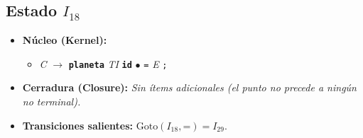 \documentclass[12pt, letterpaper]{article}
\begin{document}
\subsection*{Estado $I_{18}$ }
\begin{itemize}\setlength{\itemsep}{1pt}\setlength{\parskip}{0pt}
\item \textbf{Núcleo (Kernel):}
\begin{itemize}\setlength{\itemsep}{1pt}\setlength{\parskip}{0pt}
    \item \textit{C} $\to$ \textbf{\texttt{planeta}} \textit{TI} \textbf{\texttt{id}} $\bullet$ \texttt{=} \textit{E} \texttt{;}
\end{itemize}
\item \textbf{Cerradura (Closure):} \emph{Sin ítems adicionales (el punto no precede a ningún no terminal).}
\item \textbf{Transiciones salientes:} $\text{Goto}(I_{18}, \texttt{=}) = I_{29}$.
\end{itemize}
\vspace{2pt}
\end{document}
